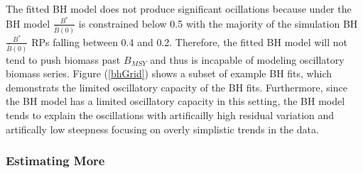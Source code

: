 %

%
The fitted BH model does not produce significant ocillations because
under the BH model $\frac{B^*}{\bar B(0)}$ is constrained below 0.5 with the
majority of the simulation BH $\frac{B^*}{\bar B(0)}$ RPs falling between 0.4 and 0.2. %
Therefore, the fitted BH model will not tend to push biomass past $B_{MSY}$ and
thus is incapable of modeling oscillatory biomass series. Figure (\ref{bhGrid})
shows a subset of example BH fits, which demonstrats the limited oscillatory
capacity of the BH fits. Furthermore, since the BH model has a limited
oscillatory capacity in this setting, the BH model tends to explain the
oscillations with artificailly high residual variation and artifically low
steepness focusing on overly simplistic trends in the data.



%
\subsubsection{Estimating More}

